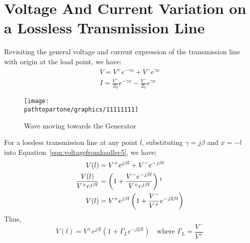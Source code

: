 \section{Voltage And Current Variation on a Lossless Transmission Line}
Revisiting the general voltage and current expression of the transmission line with origin at the load point, we have:
\begin{align}
V = V^+ e^{- \gamma x} + V^- e^{\gamma x}
\label{eqn:voltagefromloadlec5}\\
I= \frac{V^+}{Z_0} e^{- \gamma x} - \frac{V^-}{Z_0} e^{\gamma x}
\label{eqn:currentfromloadlec5}
\end{align}
\begin{figure}[h]
\centering
\texttt{[image: \\pathtopartone/graphics/11111111]}
\caption{Wave moving towards the Generator}
\label{fig:11111111}
\end{figure}

For a lossless transmission line at any point $l$, substituting $\gamma = j\beta$ and $x=-l$ into Equation~\eqref{eqn:voltagefromloadlec5}, we have;
\begin{align*}
V(l) &= V^+ e^{j \beta l} + V^- e^{-j\beta l}\\
\frac{V(l)}{ V^+ e^{j \beta l}} &= \left(1 +\frac{V^- e^{- j \beta l}}{V^+ e^{j \beta l}}\right)\footnotemark\\
V(l) &= V^+ e^{j \beta l}\left(1+ \frac{V^-}{V^+}e^{-j 2 \beta l}\right)
\end{align*}
Thus,
\begin{equation}
V(l) = V^+ e^{j \beta l}(1 + \Gamma_L e^{-j 2 \beta l})\quad\text{where }\Gamma _L = \frac{V^-}{V^+}
\label{eqn:voltagefromloadlossless}
\end{equation}

